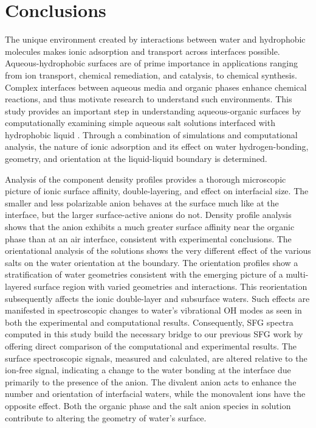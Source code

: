 \section{Conclusions}

The unique environment created by interactions between water and hydrophobic molecules makes ionic adsorption and transport across interfaces possible. Aqueous-hydrophobic surfaces are of prime importance in applications ranging from ion transport, chemical remediation, and catalysis, to chemical synthesis. Complex interfaces between aqueous media and organic phases enhance chemical reactions, and thus motivate research to understand such environments. This study provides an important step in understanding aqueous-organic surfaces by computationally examining simple aqueous salt solutions interfaced with hydrophobic liquid \ctc. Through a combination of simulations and computational analysis, the nature of ionic adsorption and its effect on water hydrogen-bonding, geometry, and orientation at the liquid-liquid boundary is determined.

Analysis of the component density profiles provides a thorough microscopic picture of ionic surface affinity, double-layering, and effect on interfacial size. The smaller and less polarizable \cl anion behaves at the \ctcwat surface much like at the \airwat interface, but the larger surface-active anions do not. Density profile analysis shows that the \nit anion exhibits a much greater surface affinity near the organic phase than at an air interface, consistent with experimental conclusions. The orientational analysis of the solutions shows the very different effect of the various salts on the water orientation at the \ctcwat boundary. The orientation profiles show a stratification of water geometries consistent with the emerging picture of a multi-layered surface region with varied geometries and interactions. This reorientation subsequently affects the ionic double-layer and subsurface waters. Such effects are manifested in spectroscopic changes to water's vibrational OH modes as seen in both the experimental and computational results. Consequently, SFG spectra computed in this study build the necessary bridge to our previous SFG work by offering direct comparison of the computational and experimental results. The surface spectroscopic signals, measured and calculated, are altered relative to the ion-free signal, indicating a change to the water bonding at the interface due primarily to the presence of the anion. The divalent \sul anion acts to enhance the number and orientation of interfacial waters, while the monovalent ions have the opposite effect. Both the organic phase and the salt anion species in solution contribute to altering the geometry of water's surface. 

